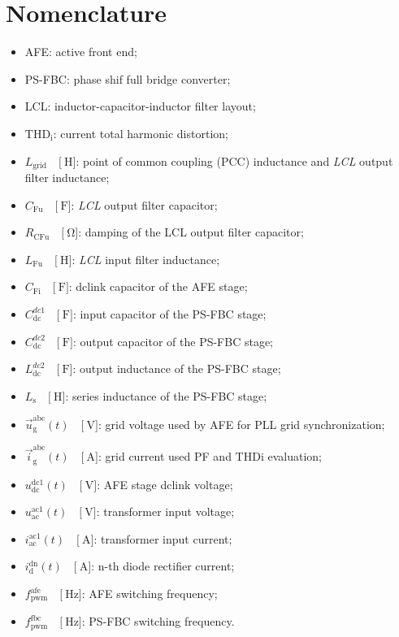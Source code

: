\documentclass[11pt,a4paper]{scrartcl}
\begin{document}
\section*{Nomenclature}
\begin{itemize}
	\item[--] AFE: active front end;
	\item[--] PS-FBC: phase shif full bridge converter;
	\item[--] LCL: inductor-capacitor-inductor filter layout;
	\item[--] $\text{THD}_\text{i}$: current total harmonic distortion;
	\item[--] $L_\text{grid}\quad\Big[\SI{}{\henry}\Big]$: point of common coupling ({PCC}) inductance and \emph{LCL} output filter inductance;
	\item[--] $C_\text{Fu}\quad\Big[\SI{}{\farad}\Big]$: \emph{LCL} output filter capacitor;	
	\item[--] $R_\text{CFu}\quad\Big[\SI{}{\ohm}\Big]$: damping of the LCL output filter capacitor;	
	\item[--] $L_\text{Fu}\quad\Big[\SI{}{\henry}\Big]$: \emph{LCL} input filter inductance;	
	\item[--] $C_\text{Fi}\quad\Big[\SI{}{\farad}\Big]$: dclink capacitor of the AFE stage;	
	\item[--] $C_\text{dc}^{dc1}\quad\Big[\SI{}{\farad}\Big]$: input capacitor of the PS-FBC stage;	
	\item[--] $C_\text{dc}^{dc2}\quad\Big[\SI{}{\farad}\Big]$: output capacitor of the PS-FBC stage;	
	\item[--] $L_\text{dc}^{dc2}\quad\Big[\SI{}{\farad}\Big]$: output inductance of the PS-FBC stage;
	\item[--] $L_\text{s}\quad\Big[\SI{}{\henry}\Big]$: series inductance of the PS-FBC stage;	
	\item[--] $\vec{u}_\text{g}^\text{abc}(t)\quad\Big[\SI{}{\volt}\Big]$: grid voltage used by AFE for PLL grid synchronization;	
	\item[--] $\vec{i}_\text{g}^\text{abc}(t)\quad\Big[\SI{}{\ampere}\Big]$: grid current used PF and THDi evaluation;	
	\item[--] $u_\text{dc}^\text{dc1}(t)\quad\Big[\SI{}{\volt}\Big]$: AFE stage dclink voltage;	
	\item[--] $u_\text{ac}^\text{ac1}(t)\quad\Big[\SI{}{\volt}\Big]$: transformer input voltage;			
	\item[--] $i_\text{ac}^\text{ac1}(t)\quad\Big[\SI{}{\ampere}\Big]$: transformer input current;		
	\item[--] $i_\text{d}^\text{dn}(t)\quad\Big[\SI{}{\ampere}\Big]$: n-th diode rectifier current;	
	\item[--] $f_\text{pwm}^\text{afe}\quad\Big[\SI{}{\hertz}\Big]$: AFE switching frequency;
	\item[--] $f_\text{pwm}^\text{fbc}\quad\Big[\SI{}{\hertz}\Big]$: PS-FBC switching frequency.		
\end{itemize}
\end{document}
